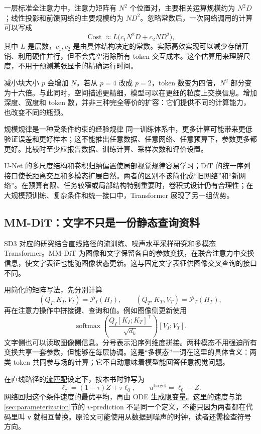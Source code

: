 一层标准全注意力中，注意力矩阵有 $N^2$ 个位置对，主要相关运算规模约为 $N^2D$；线性投影和前馈网络的主要规模约为 $ND^2$。忽略常数后，一次网络调用的计算可以写成
\[
\operatorname{Cost}\approx L\bigl(c_1N^2D+c_2ND^2\bigr),
\]
其中 $L$ 是层数，$c_1,c_2$ 是由具体结构决定的常数。实际高效实现可以减少存储开销、利用硬件并行，但不会凭空消除所有 token 交互成本。这个估算用来理解尺度，不用于预测某张显卡的精确运行时间。

减小块大小 $p$ 会增加 $N$。若从 $p=4$ 改成 $p=2$，token 数变为四倍，$N^2$ 部分变为十六倍。与此同时，空间描述更精细，模型可以在更细的粒度上交换信息。增加深度、宽度和 token 数，并非三种完全等价的扩容：它们提供不同的计算能力，也改变不同的瓶颈。

\begin{keybox}{规模规律是一种受条件约束的经验规律}
同一训练体系中，更多计算可能带来更低验证误差和更好样本；这不能推出任意数据、任意网络、任意预算下，参数更多都更好。比较时至少应报告数据、训练计算、采样次数和评价设置。
\end{keybox}

U-Net 的多尺度结构和卷积归纳偏置使局部视觉规律容易学习；DiT 的统一序列接口使长距离交互和多模态扩展自然。两者的区别不该简化成“旧网络”和“新网络”。在预算有限、任务较窄或局部结构特别重要时，卷积式设计仍有合理性；在大规模预训练、复杂条件和统一接口中，Transformer 展现了另一组优势。

\subsection{MM-DiT：文字不只是一份静态查询资料}

SD3 对应的研究结合直线路径的流训练、噪声水平采样研究和多模态 Transformer。MM-DiT 为图像和文字保留各自的参数变换，在联合注意力中交换信息，使文字表征也能随图像状态更新。这与固定文字表征供图像交叉查询的接口不同。\cite{a_sd3}

用简化的矩阵写法，先分别计算
\[
(Q_I,K_I,V_I)=\mathcal P_I(H_I),\qquad
(Q_T,K_T,V_T)=\mathcal P_T(H_T),
\]
再在注意力操作中拼接键、查询和值。例如图像侧更新使用
\[
\operatorname{softmax}\!\left(
 \frac{Q_I[K_I;K_T]^\top}{\sqrt{d_k}}\right)[V_I;V_T].
\]
文字侧也可以读取图像侧信息。分号表示沿序列维度拼接。两种模态不用强迫所有变换共享一套参数，但能够在每层协调。这是“多模态”一词在这里的具体含义：两类 token 共同参与场的计算；它不自动意味着模型能回答任意视觉问题。

在直线路径的\hyperref[sec:flowmatching]{流匹配}设定下，按本书时钟写为
\[
\ell_\tau=(1-\tau)Z+\tau\ell_0,
\qquad u^{\mathrm{target}}=\ell_0-Z.
\]
网络回归这个条件速度的最优平均，再由 ODE 生成隐变量。这里的速度与第\ref{sec:parameterization}节的 $v$-prediction 不是同一个定义，不能只因为两者都在代码里叫 \texttt{v} 就相互替换。原论文可能使用从数据到噪声的时钟，读者还需检查符号方向。

